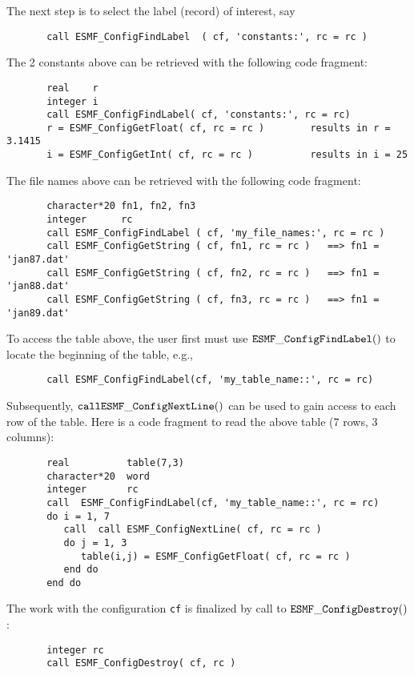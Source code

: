     The next step is to select the label (record) of interest, say

 \begin{verbatim}
       call ESMF_ConfigFindLabel  ( cf, 'constants:', rc = rc )
 \end{verbatim}

  The 2 constants above can be retrieved with the following code
  fragment:
 \begin{verbatim}
       real    r
       integer i
       call ESMF_ConfigFindLabel( cf, 'constants:', rc = rc)
       r = ESMF_ConfigGetFloat( cf, rc = rc )        results in r = 3.1415
       i = ESMF_ConfigGetInt( cf, rc = rc )          results in i = 25
 \end{verbatim}

  The file names above can be retrieved with the following
  code fragment:
 \begin{verbatim}
       character*20 fn1, fn2, fn3
       integer      rc
       call ESMF_ConfigFindLabel ( cf, 'my_file_names:', rc = rc )
       call ESMF_ConfigGetString ( cf, fn1, rc = rc )   ==> fn1 = 'jan87.dat'
       call ESMF_ConfigGetString ( cf, fn2, rc = rc )   ==> fn1 = 'jan88.dat'
       call ESMF_ConfigGetString ( cf, fn3, rc = rc )   ==> fn1 = 'jan89.dat'
 \end{verbatim}

 To access the table above, the user first must use 
 ${\tt ESMF\_ConfigFindLabel()}$ to locate the beginning of the table, e.g.,

 \begin{verbatim}
       call ESMF_ConfigFindLabel(cf, 'my_table_name::', rc = rc)
 \end{verbatim}

 Subsequently, ${\tt call ESMF\_ConfigNextLine()}$ can be used to gain 
 access to each row of the table. Here is a code fragment to read the above
 table (7 rows, 3 columns):

 \begin{verbatim}
       real          table(7,3)
       character*20  word
       integer       rc
       call  ESMF_ConfigFindLabel(cf, 'my_table_name::', rc = rc)
       do i = 1, 7
          call  call ESMF_ConfigNextLine( cf, rc = rc )
          do j = 1, 3
             table(i,j) = ESMF_ConfigGetFloat( cf, rc = rc )
          end do                   
       end do
 \end{verbatim}

 The work with the configuration {\tt cf} is finalized by call to
 ${\tt ESMF\_ConfigDestroy()}$:
 \begin{verbatim}
       integer rc
       call ESMF_ConfigDestroy( cf, rc )
 \end{verbatim}

